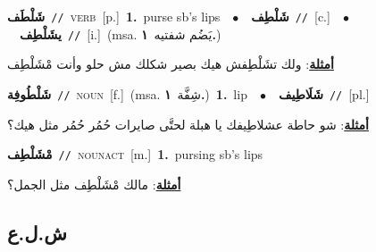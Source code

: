 \documentclass[10pt,a4paper,twoside]{article} %
\begin{document}
\begin{multicols}{2}
{\setlength\topsep{0pt}\textbf{\foreignlanguage{arabic}{شَلْطَف}}\ {\color{gray}\texttt{//}\color{black}}\ \textsc{verb}\ [p.]\ \textbf{1.}~purse sb's lips\ \ $\bullet$\ \ \setlength\topsep{0pt}\textbf{\foreignlanguage{arabic}{شَلْطِف}}\ {\color{gray}\texttt{//}\color{black}}\ [c.]\ \ $\bullet$\ \ \setlength\topsep{0pt}\textbf{\foreignlanguage{arabic}{يشَلْطِف}}\ {\color{gray}\texttt{//}\color{black}}\ [i.]\ \color{gray}(msa. \foreignlanguage{arabic}{يَضُم شفتيه}~\foreignlanguage{arabic}{\textbf{١.}})\color{black}\  \begin{flushright}\color{gray}\foreignlanguage{arabic}{\textbf{\underline{\foreignlanguage{arabic}{أمثلة}}}: ولك تشَلْطِفش هيك بصير شكلك مش حلو وأنت مْشَلْطِف}\end{flushright}\color{black}} \vspace{2mm}

{\setlength\topsep{0pt}\textbf{\foreignlanguage{arabic}{شَلْطُوفِة}}\ {\color{gray}\texttt{//}\color{black}}\ \textsc{noun}\ [f.]\ \color{gray}(msa. \foreignlanguage{arabic}{شِفَّة}~\foreignlanguage{arabic}{\textbf{١.}})\color{black}\ \textbf{1.}~lip\ \ $\bullet$\ \ \setlength\topsep{0pt}\textbf{\foreignlanguage{arabic}{شَلَاطِيف}}\ {\color{gray}\texttt{//}\color{black}}\ [pl.]\  \begin{flushright}\color{gray}\foreignlanguage{arabic}{\textbf{\underline{\foreignlanguage{arabic}{أمثلة}}}: شو حاطة عشلاطِيفك يا هبلة لحتَّى صايرات حُمُر حُمُر مثل هيك؟}\end{flushright}\color{black}} \vspace{2mm}

{\setlength\topsep{0pt}\textbf{\foreignlanguage{arabic}{مْشَلْطِف}}\ {\color{gray}\texttt{//}\color{black}}\ \textsc{noun\textunderscore act}\ [m.]\ \textbf{1.}~pursing sb's lips\  \begin{flushright}\color{gray}\foreignlanguage{arabic}{\textbf{\underline{\foreignlanguage{arabic}{أمثلة}}}: مالك مْشَلْطِف مثل الجمل؟}\end{flushright}\color{black}} \vspace{2mm}

\vspace{-3mm}
\subsection*{\color{blue}\foreignlanguage{arabic}{ش.ل.ع}\color{blue}{}} 


\end{multicols}
\end{document}
